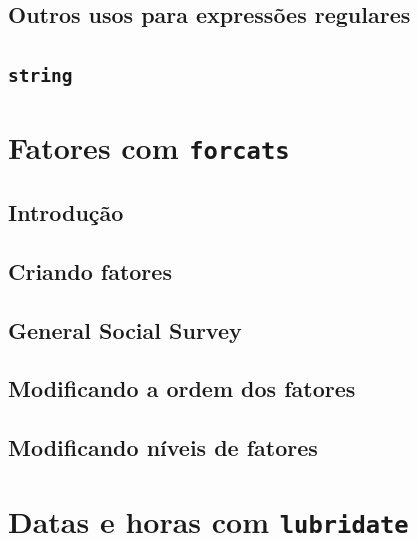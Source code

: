 \documentclass[
]{latex/krantz}
\theoremstyle{definition}
\theoremstyle{definition}
\theoremstyle{definition}
\theoremstyle{definition}
\theoremstyle{remark}
\begin{document}
\hypertarget{outros-usos-para-expressuxf5es-regulares}{%
\section{Outros usos para expressões regulares}\label{outros-usos-para-expressuxf5es-regulares}}

\hypertarget{string}{%
\section{\texorpdfstring{\texttt{string}}{string}}\label{string}}

\hypertarget{fatores-com-forcats}{%
\chapter{\texorpdfstring{Fatores com \texttt{forcats}}{Fatores com forcats}}\label{fatores-com-forcats}}

\hypertarget{introduuxe7uxe3o-8}{%
\section{Introdução}\label{introduuxe7uxe3o-8}}

\hypertarget{criando-fatores}{%
\section{Criando fatores}\label{criando-fatores}}

\hypertarget{general-social-survey}{%
\section{General Social Survey}\label{general-social-survey}}

\hypertarget{modificando-a-ordem-dos-fatores}{%
\section{Modificando a ordem dos fatores}\label{modificando-a-ordem-dos-fatores}}

\hypertarget{modificando-nuxedveis-de-fatores}{%
\section{Modificando níveis de fatores}\label{modificando-nuxedveis-de-fatores}}

\hypertarget{datas-e-horas-com-lubridate}{%
\chapter{\texorpdfstring{Datas e horas com \texttt{lubridate}}{Datas e horas com lubridate}}\label{datas-e-horas-com-lubridate}}
\end{document}
